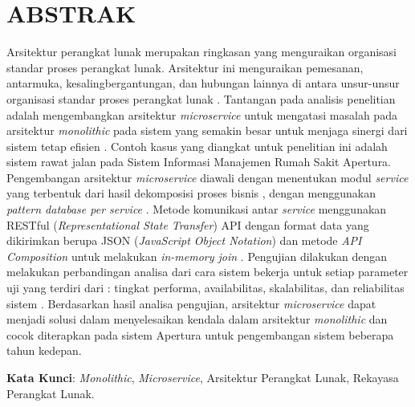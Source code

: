 \chapter*{ABSTRAK}

\noindent Arsitektur perangkat lunak merupakan ringkasan yang menguraikan organisasi standar proses perangkat lunak. Arsitektur ini menguraikan pemesanan, antarmuka, kesalingbergantungan, dan hubungan lainnya di antara unsur-unsur organisasi standar proses perangkat lunak \cite{14}. Tantangan pada analisis penelitian adalah mengembangkan arsitektur \textit{microservice} untuk mengatasi masalah pada arsitektur \textit{monolithic} pada sistem yang semakin besar untuk menjaga sinergi dari sistem tetap efisien \cite{9}. Contoh kasus yang diangkat untuk penelitian ini adalah sistem rawat jalan pada Sistem Informasi Manajemen Rumah Sakit Apertura. Pengembangan arsitektur \textit{microservice} diawali dengan menentukan modul \textit{service} yang terbentuk dari hasil dekomposisi proses bisnis \cite{6}, dengan menggunakan \textit{pattern database per service} \cite{6}. Metode komunikasi antar \textit{service} menggunakan RESTful (\textit{Representational State Transfer}) API dengan format data yang dikirimkan berupa JSON (\textit{JavaScript Object Notation}) \cite{9} dan metode \textit{API Composition} untuk melakukan \textit{in-memory join} \cite{6}. Pengujian dilakukan dengan melakukan perbandingan analisa dari cara sistem bekerja untuk setiap parameter uji yang terdiri dari : tingkat performa, availabilitas, skalabilitas, dan reliabilitas sistem \cite{10}. Berdasarkan hasil analisa pengujian, arsitektur \textit{microservice} dapat menjadi solusi dalam menyelesaikan kendala dalam arsitektur \textit{monolithic} dan cocok diterapkan pada sistem Apertura untuk pengembangan sistem beberapa tahun kedepan.

\noindent\textbf{Kata Kunci}: \textit{Monolithic}, \textit{Microservice}, Arsitektur Perangkat Lunak, Rekayasa Perangkat Lunak.